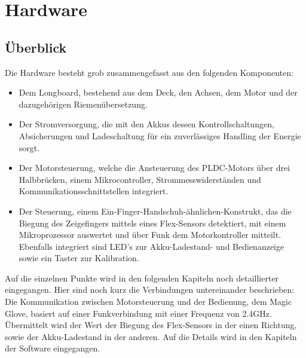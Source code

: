 \chapter{Hardware}
\label{Hardware}

\section{Überblick}
\label{HWUeberblick}
Die Hardware besteht grob zusammengefasst aus den folgenden Komponenten:
\begin{itemize}
	\item Dem Longboard, bestehend aus dem Deck, den Achsen, dem Motor und der dazugehörigen Riemenübersetzung.
	\item Der Stromversorgung, die mit den Akkus dessen Kontrollschaltungen, Absicherungen und Ladeschaltung für ein zuverlässiges Handling der Energie sorgt.
	\item Der Motorsteuerung, welche die Ansteuerung des PLDC-Motors über drei Halbbrücken, einem Mikrocontroller, Strommesswiderständen und Kommunikationsschnittstellen integriert.
	\item Der Steuerung, einem Ein-Finger-Handschuh-ähnlichen-Konstrukt, das die Biegung des Zeigefingers mittels eines Flex-Sensors detektiert, mit einem Mikroprozessor auswertet und über Funk dem Motorkontroller mitteilt. Ebenfalls integriert sind LED’s zur Akku-Ladestand- und Bedienanzeige sowie ein Taster zur Kalibration.
\end{itemize}
Auf die einzelnen Punkte wird in den folgenden Kapiteln noch detaillierter eingegangen. Hier sind noch kurz die Verbindungen untereinander beschrieben:
\\
Die Kommunikation zwischen Motorsteuerung und der Bedienung, dem Magic Glove, basiert auf einer Funkverbindung mit einer Frequenz von 2.4GHz. Übermittelt wird der Wert der Biegung des Flex-Sensors in der einen Richtung, sowie der Akku-Ladestand in der anderen. Auf die Details wird in den Kapiteln der Software eingegangen.


